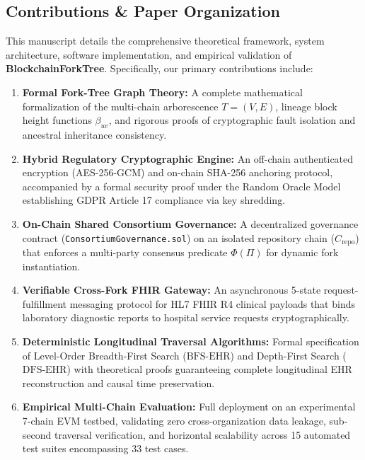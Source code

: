 \subsection{Contributions \& Paper Organization}
This manuscript details the comprehensive theoretical framework, system architecture, software implementation, and empirical validation of \textbf{BlockchainForkTree}. Specifically, our primary contributions include:
\begin{enumerate}
    \item \textbf{Formal Fork-Tree Graph Theory:} A complete mathematical formalization of the multi-chain arborescence $T = (V, E)$, lineage block height functions $\beta_{uv}$, and rigorous proofs of cryptographic fault isolation and ancestral inheritance consistency.
    \item \textbf{Hybrid Regulatory Cryptographic Engine:} An off-chain authenticated encryption (AES-256-GCM) and on-chain SHA-256 anchoring protocol, accompanied by a formal security proof under the Random Oracle Model establishing GDPR Article 17 compliance via key shredding.
    \item \textbf{On-Chain Shared Consortium Governance:} A decentralized governance contract (\texttt{ConsortiumGovernance.sol}) on an isolated repository chain ($C_{\text{repo}}$) that enforces a multi-party consensus predicate $\Phi(\Pi)$ for dynamic fork instantiation.
    \item \textbf{Verifiable Cross-Fork FHIR Gateway:} An asynchronous 5-state request-fulfillment messaging protocol for HL7 FHIR R4 clinical payloads that binds laboratory diagnostic reports to hospital service requests cryptographically.
    \item \textbf{Deterministic Longitudinal Traversal Algorithms:} Formal specification of Level-Order Breadth-First Search ($\text{BFS-EHR}$) and Depth-First Search ($\text{DFS-EHR}$) with theoretical proofs guaranteeing complete longitudinal EHR reconstruction and causal time preservation.
    \item \textbf{Empirical Multi-Chain Evaluation:} Full deployment on an experimental 7-chain EVM testbed, validating zero cross-organization data leakage, sub-second traversal verification, and horizontal scalability across 15 automated test suites encompassing 33 test cases.
\end{enumerate}


